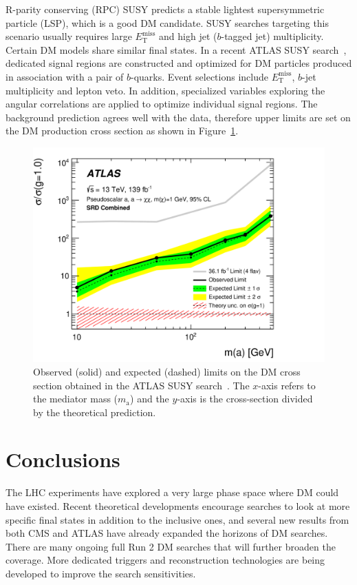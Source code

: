 \documentclass{moriond}
\def\et{E_\mathrm{T}^{\mathrm{miss}}}
\begin{document}
R-parity conserving (RPC) SUSY predicts a stable lightest supersymmetric
particle (LSP), which is a good DM candidate. SUSY searches targeting this
scenario usually requires large $\et$ and high jet ($b$-tagged jet)
multiplicity. Certain DM models share similar final states. In a recent ATLAS
SUSY search~\cite{dmbb}, dedicated signal regions are constructed and optimized
for DM particles produced in association with a pair of $b$-quarks. Event
selections include $\et$, $b$-jet multiplicity and lepton veto. In addition,
specialized variables exploring the angular correlations are applied to optimize individual signal regions. The
background prediction agrees well with the data, therefore upper limits are set
on the DM production cross section as shown in Figure~\ref{fig:dmbb}.   

\begin{figure} [htb]
\centerline{\includegraphics[width=0.5\linewidth]{DMBB}}
\caption[]{Observed (solid) and expected (dashed) limits on the DM cross section obtained in the ATLAS SUSY search~\cite{dmbb}. The $x$-axis refers to the mediator mass ($m_{\mathrm{a}}$) and the $y$-axis is the cross-section divided by the theoretical prediction.}
\label{fig:dmbb}
\end{figure}

\section{Conclusions}

The LHC experiments have explored a very large phase space where DM could have
existed. Recent theoretical developments encourage searches to look at more
specific final states in addition to the inclusive ones, and several new
results from both CMS and ATLAS have already expanded the horizons of DM
searches.  There are many ongoing full Run 2 DM searches that will
further broaden the coverage. More dedicated triggers and reconstruction
technologies are being developed to improve the search sensitivities. 
\end{document}
